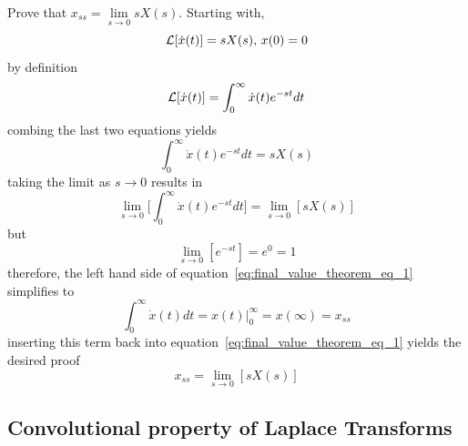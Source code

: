 \documentclass[12pt,letter]{article}
\begin{document}
\begin{mdframed}[middlelinewidth=0.5mm]
\begin{center}
\end{center}

Prove that $x_{ss} = \lim\limits_{s\rightarrow 0} s X(s)$. Starting with, 
\begin{equation}
\mathcal{L}{\left[\dot{x}(t)\right]} = s X(s)\text{, } x(0)=0
\end{equation}
by definition
\begin{equation}
\mathcal{L}{\left[\dot{x}(t)\right]} = \int_0^{\infty} \dot{x}(t)e^{-s t}dt
\end{equation}
combing the last two equations yields
\begin{equation}
\int_0^{\infty} \dot{x}(t)e^{-s t}dt = s X(s)
\end{equation}
taking the limit as $s \rightarrow 0$ results in 
\begin{equation}
\lim\limits_{s \rightarrow 0} \bigg[ \int_0^{\infty} \dot{x}(t)e^{-s t}dt \bigg] = \lim\limits_{s \rightarrow 0}[s X(s)]
\label{eq:final_value_theorem_eq_1}
\end{equation}
but
\begin{equation}
\lim\limits_{s \rightarrow 0} [ e^{-s t}] = e^0 = 1
\end{equation}
therefore, the left hand side of equation~\ref{eq:final_value_theorem_eq_1} simplifies to 
\begin{equation}
\int_0^{\infty} \dot{x}(t)dt = x(t)  \big|_{0}^{\infty} = x(\infty) = x_{ss}
\end{equation}
inserting this term back into equation~\ref{eq:final_value_theorem_eq_1} yields the desired proof
\begin{equation}
x_{ss} =  \lim\limits_{s\rightarrow 0} [s X(s)]
\end{equation}

\end{mdframed}


\subsection{Convolutional property of Laplace Transforms}
\end{document}
